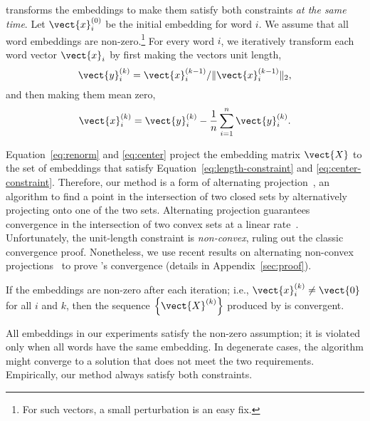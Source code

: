 \name{} transforms the embeddings to make them satisfy both
constraints \textit{at the same time}.
Let $\vect{x}^{(0)}_i$ be the initial embedding for word $i$.
We assume that all word embeddings are non-zero.\footnote{For such vectors,
a small perturbation is an easy fix.}
For every word $i$, we iteratively transform each word vector
$\vect{x}_i$ by first making the vectors unit length,
\begin{equation}
  \vect{y}_i^{(k)} = \vect{x}_i^{(k-1)} / \| \vect{x}_i^{(k-1)} \|_2, \label{eq:renorm}
\end{equation}
  and then making them mean zero,
\begin{equation}
  \vect{x}_i^{(k)} = \vect{y}_i^{(k)}-\frac{1}{n} \sum_{i=1}^n \vect{y}_i^{(k)}.\label{eq:center}
\end{equation}

Equation~\eqref{eq:renorm} and \eqref{eq:center} project the embedding matrix
$\vect{X}$ to the set of embeddings that satisfy
Equation~\eqref{eq:length-constraint} and \eqref{eq:center-constraint}.
Therefore, our method is a form of alternating
projection~\citep{bauschke1996projection}, an algorithm to find a point in the
intersection of two closed sets by alternatively projecting onto one of the two
sets.
%
Alternating projection guarantees convergence in the intersection of
two convex sets at a linear rate~\cite{gubin1967method,
  bauschke1993convergence}.
%
Unfortunately, the unit-length constraint is \emph{non-convex}, ruling out the
classic convergence proof.
%
Nonetheless, we use recent results on alternating non-convex
projections~\cite{zhu2018convergence} to prove \name{}'s
convergence (details in Appendix~\ref{sec:proof}).

\begin{theorem}\label{thm:converge}
  If the embeddings are non-zero after each iteration; i.e., $\vect{x}_i^{(k)}
  \neq \vect{0}$ for all $i$ and $k$, then the sequence $\left\{ \vect{X}^{(k)}
  \right\}$ produced by \name{} is convergent.
\end{theorem}

All embeddings in our experiments satisfy the non-zero assumption; it is violated only when all words have the same embedding.
In degenerate cases, the algorithm might converge to a solution that does not
meet the two requirements.
Empirically, our method always satisfy both constraints.

